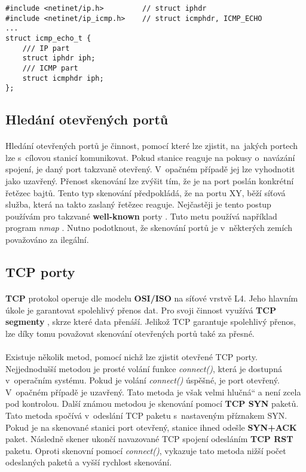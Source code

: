\documentclass[a4paper,11pt,onecolumn,notitlepage]{article}
\providecommand{\uv}[1]{\quotedblbase #1\textquotedblleft}
\begin{document}
\begin{lstlisting}[frame=single,caption={Struktura výsledného ICMP dotazu},captionpos=b]
#include <netinet/ip.h>         // struct iphdr
#include <netinet/ip_icmp.h>    // struct icmphdr, ICMP_ECHO
...
struct icmp_echo_t {
    /// IP part
    struct iphdr iph;
    /// ICMP part
    struct icmphdr iph;
};
\end{lstlisting}\label{fig:ICMP_ECHO_PACKET}

\subsection{Hledání otevřených portů}
\paragraph{} Hledání otevřených portů je činnost, pomocí které lze zjistit, na~jakých portech lze s~cílovou stanicí komunikovat. Pokud stanice reaguje na pokusy o~navázání spojení, je daný port takzvaně otevřený. V~opačném případě jej lze vyhodnotit jako uzavřený. Přenost skenování lze zvýšit tím, že je na port poslán konkrétní řetězec bajtů. Tento typ skenování předpokládá, že na portu XY, běží síťová služba, která na takto zaslaný řetězec reaguje. Nejčastěji je tento postup používám pro takzvané \textbf{well-known} porty \cite{WIKI_wellKnownPorts}. Tuto metu používá například program \emph{nmap} \cite{DOC_man_NMAP}. Nutno podotknout, že skenování portů je v~některých zemích považováno za ilegální.

\subsection{TCP porty}\label{fig:CHAPTER_TCP}
\paragraph{} \textbf{TCP} protokol operuje dle modelu \textbf{OSI/ISO} na síťové vrstvě L4. Jeho hlavním úkole je garantovat spolehlivý přenos dat. Pro svoji činnost využívá \textbf{TCP segmenty} \cite{WIKI_TCP}, skrze které data přenáší. Jelikož TCP garantuje spolehlivý přenos, lze díky tomu považovat skenování otevřených portů také za přesné.

\paragraph{} Existuje několik metod, pomocí nichž lze zjistit otevřené TCP porty. Nejjednodušší metodou je prosté volání funkce \emph{connect()}, která je dostupná v~operačním systému. Pokud je volání \emph{connect()} úspěšné, je port otevřený. V~opačném případě je uzavřený. Tato metoda je však velmi \uv{hlučná} a není zcela pod kontrolou. Další známou metodou je skenování pomocí \textbf{TCP SYN} paketů. Tato metoda spočívá v~odeslání TCP paketu s~nastaveným příznakem SYN. Pokud je na skenované stanici port otevřený, stanice ihned odešle \textbf{SYN+ACK} paket. Následně skener ukončí navazované TCP spojení odesláním \textbf{TCP RST} paketu. Oproti skenovní pomocí \emph{connect()}, vykazuje tato metoda nižší počet odeslaných paketů a vyšší rychlost skenování.
\end{document}
